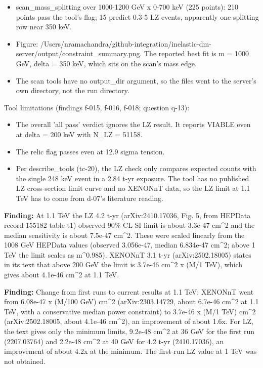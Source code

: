 \documentclass[11pt,a4paper]{article}
\begin{document}
\begin{itemize}
  \item scan\_mass\_splitting over 1000-1200 GeV x 0-700 keV (225 points): 210 points pass the tool's flag; 15 predict 0.3-5 LZ events, apparently one splitting row near 350 keV.
  \item Figure: /Users/nramachandra/github-integration/inelastic-dm-server/output/constraint\_summary.png. The reported best fit is m = 1000 GeV, delta = 350 keV, which sits on the scan's mass edge.
  \item The scan tools have no output\_dir argument, so the files went to the server's own directory, not the run directory.
\end{itemize}
Tool limitations (findings f-015, f-016, f-018; question q-13):

\begin{itemize}
  \item The overall 'all pass' verdict ignores the LZ result. It reports VIABLE even at delta = 200 keV with N\_LZ = 51158.
  \item The relic flag passes even at 12.9 sigma tension.
  \item Per describe\_tools (tc-20), the LZ check only compares expected counts with the single 248 keV event in a 2.84 t-yr exposure. The tool has no published LZ cross-section limit curve and no XENONnT data, so the LZ limit at 1.1 TeV has to come from d-07's literature reading.
\end{itemize}
\textbf{Finding:} At 1.1 TeV the LZ 4.2 t-yr (arXiv:2410.17036, Fig. 5, from HEPData record 155182 table t1) observed 90\% CL SI limit is about 3.3e-47 cm\textasciicircum{}2 and the median sensitivity is about 7.5e-47 cm\textasciicircum{}2. These were scaled linearly from the 1008 GeV HEPData values (observed 3.056e-47, median 6.834e-47 cm\textasciicircum{}2; above 1 TeV the limit scales as m\textasciicircum{}0.985). XENONnT 3.1 t-yr (arXiv:2502.18005) states in its text that above 200 GeV the limit is 3.7e-46 cm\textasciicircum{}2 x (M/1 TeV), which gives about 4.1e-46 cm\textasciicircum{}2 at 1.1 TeV.

\textbf{Finding:} Change from first runs to current results at 1.1 TeV: XENONnT went from 6.08e-47 x (M/100 GeV) cm\textasciicircum{}2 (arXiv:2303.14729, about 6.7e-46 cm\textasciicircum{}2 at 1.1 TeV, with a conservative median power constraint) to 3.7e-46 x (M/1 TeV) cm\textasciicircum{}2 (arXiv:2502.18005, about 4.1e-46 cm\textasciicircum{}2), an improvement of about 1.6x. For LZ, the text gives only the minimum limits, 9.2e-48 cm\textasciicircum{}2 at 36 GeV for the first run (2207.03764) and 2.2e-48 cm\textasciicircum{}2 at 40 GeV for 4.2 t-yr (2410.17036), an improvement of about 4.2x at the minimum. The first-run LZ value at 1 TeV was not obtained.
\end{document}
